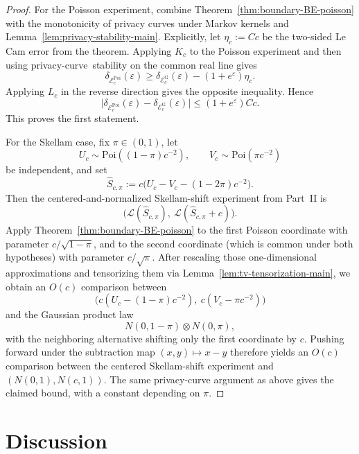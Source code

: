 \documentclass{article}
\newcommand{\Poi}{\mathrm{Poi}}
\newcommand{\1}{\mathbf 1}
\newcommand{\privacycurve}{\mbox{privacy-curve}}
\begin{document}
\begin{proof}
For the Poisson experiment, combine Theorem~\ref{thm:boundary-BE-poisson} with the monotonicity of privacy curves
under Markov kernels and Lemma~\ref{lem:privacy-stability-main}. Explicitly, let $\eta_c:=Cc$ be the two-sided
Le Cam error from the theorem. Applying $K_c$ to the Poisson experiment and then using \privacycurve\ stability on
the common real line gives
\[
\delta_{\mathcal E_c^{\mathrm{Poi}}}(\varepsilon)
\ge
\delta_{\mathcal E_c^{\mathrm G}}(\varepsilon)-(1+e^\varepsilon)\eta_c.
\]
Applying $L_c$ in the reverse direction gives the opposite inequality. Hence
\[
\bigl|\delta_{\mathcal E_c^{\mathrm{Poi}}}(\varepsilon)-\delta_{\mathcal E_c^{\mathrm G}}(\varepsilon)\bigr|
\le (1+e^\varepsilon)Cc.
\]
This proves the first statement.

For the Skellam case, fix $\pi\in(0,1)$, let
\[
U_c\sim \Poi((1-\pi)c^{-2}),
\qquad
V_c\sim \Poi(\pi c^{-2})
\]
be independent, and set
\[
\widehat S_{c,\pi}:=c\bigl(U_c-V_c-(1-2\pi)c^{-2}\bigr).
\]
Then the centered-and-normalized Skellam-shift experiment from Part~II is
\[
\bigl(\mathcal L(\widehat S_{c,\pi}),\ \mathcal L(\widehat S_{c,\pi}+c)\bigr).
\]
Apply Theorem~\ref{thm:boundary-BE-poisson} to the first Poisson coordinate with parameter
$c/\sqrt{1-\pi}$, and to the second coordinate (which is common under both hypotheses) with parameter
$c/\sqrt{\pi}$. After rescaling those one-dimensional approximations and tensorizing them via
Lemma~\ref{lem:tv-tensorization-main}, we obtain an $O(c)$ comparison between
\[
\bigl(c(U_c-(1-\pi)c^{-2}),\ c(V_c-\pi c^{-2})\bigr)
\]
and the Gaussian product law
\[
N(0,1-\pi)\otimes N(0,\pi),
\]
with the neighboring alternative shifting only the first coordinate by $c$. Pushing forward under the subtraction
map $(x,y)\mapsto x-y$ therefore yields an $O(c)$ comparison between the centered Skellam-shift experiment and
$(N(0,1),N(c,1))$. The same privacy-curve argument as above gives the claimed bound, with a constant depending on
$\pi$.
\end{proof}

\section{Discussion}
\end{document}
